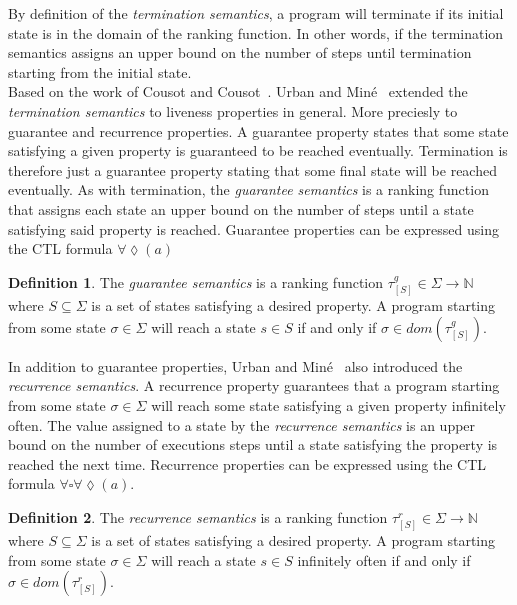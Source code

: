\documentclass[11pt,a4paper,titlepage]{article}
\theoremstyle{definition}
\newtheorem{definition}{Definition}[section]
\begin{document}
By definition of the \textit{termination semantics}, a program will terminate if its initial state is in the domain of
the ranking function. In other words, if the termination semantics assigns an upper bound on the number of steps until termination
starting from the initial state.\\

Based on the work of Cousot and Cousot~\cite{CousotCousot-POPL12}. Urban and Miné~\cite{UrbanM-VMCAI15} extended the 
\textit{termination semantics} to liveness properties in general. More preciesly to guarantee and recurrence properties. 
A guarantee property states that some state satisfying a given property is guaranteed to be reached eventually. Termination is therefore just a 
guarantee property stating that some final state will be reached eventually. As with termination, 
the \textit{guarantee semantics} is a ranking function that assigns each state an upper bound on the number of steps
until a state satisfying said property is reached. Guarantee properties can be expressed using the CTL formula $\forall\lozenge(a)$

\begin{definition}
    The \textit{guarantee semantics} is a ranking function 
    $\tau_{[S]}^{g} \in \Sigma \rightarrow \mathbb{N}$
    where $S \subseteq \Sigma$ is a set of states satisfying a desired property.
    A program starting from some state $\sigma \in \Sigma$ will reach a state 
    $s \in S$ if and only if $\sigma \in dom(\tau_{[S]}^{g})$.
\end{definition}

In addition to guarantee properties, Urban and Miné~\cite{UrbanM-VMCAI15} also introduced the \textit{recurrence semantics}.
A recurrence property guarantees that a program starting from some state $\sigma \in \Sigma$ will reach some state satisfying
a given property infinitely often. The value assigned to a state by the \textit{recurrence semantics}
is an upper bound on the number of executions steps until a state satisfying the property is reached the next time. 
Recurrence properties can be expressed using the CTL formula $\forall\square\forall\lozenge(a)$.

\begin{definition}
    The \textit{recurrence semantics} is a ranking function 
    $\tau_{[S]}^{r} \in \Sigma \rightarrow \mathbb{N}$
    where $S \subseteq \Sigma$ is a set of states satisfying a desired property.
    A program starting from some state $\sigma \in \Sigma$ will reach a state 
    $s \in S$ infinitely often if and only if $\sigma \in dom(\tau_{[S]}^{r})$.
\end{definition}
\end{document}
